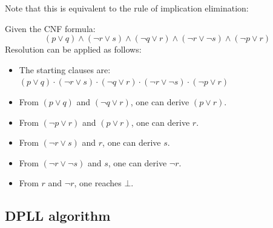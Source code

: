 \begin{description}
\begin{descriptionlist}
                Note that this is equivalent to the rule of implication elimination:\\
                \begin{minipage}{0.4\linewidth}
                    \begin{prooftree}
                    \end{prooftree}
                \end{minipage}
                \begin{minipage}{0.4\linewidth}
                    \begin{prooftree}
                    \end{prooftree}
                \end{minipage}
        \end{descriptionlist}
\end{description}

\begin{example}
    Given the CNF formula:
    \[ (p \vee q) \land (\lnot r \vee s) \land (\lnot q \vee r) \land (\lnot r \vee \lnot s) \land (\lnot p \vee r) \]
    Resolution can be applied as follows:
    \begin{itemize}
        \item The starting clauses are:
            $(p \vee q) \cdot (\lnot r \vee s) \cdot (\lnot q \vee r) \cdot (\lnot r \vee \lnot s) \cdot (\lnot p \vee r)$
        \item From $(p \vee q)$ and $(\lnot q \vee r)$, one can derive $(p \vee r)$.
        \item From $(\lnot p \vee r)$ and $(p \vee r)$, one can derive $r$.
        \item From $(\lnot r \vee s)$ and $r$, one can derive $s$.
        \item From $(\lnot r \vee \lnot s)$ and $s$, one can derive $\lnot r$.
        \item From $r$ and $\lnot r$, one reaches $\bot$.
    \end{itemize}
\end{example}



\subsection{DPLL algorithm}

